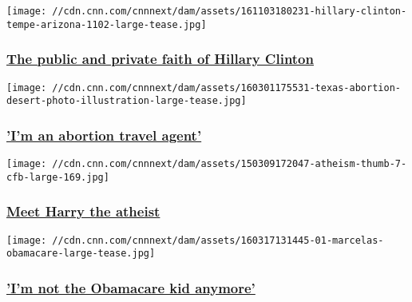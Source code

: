 \href{/2016/10/30/politics/clinton-faith-private/index.html}{}

\texttt{[image: //cdn.cnn.com/cnnnext/dam/assets/161103180231-hillary-clinton-tempe-arizona-1102-large-tease.jpg]}

\hypertarget{the-public-and-private-faith-of-hillary-clinton}{%
\subsubsection{\texorpdfstring{\href{/2016/10/30/politics/clinton-faith-private/index.html}{The
public and private faith of Hillary
Clinton}}{The public and private faith of Hillary Clinton}}\label{the-public-and-private-faith-of-hillary-clinton}}

\href{/2016/02/26/health/texas-abortion-access-desert/index.html}{}

\texttt{[image: //cdn.cnn.com/cnnnext/dam/assets/160301175531-texas-abortion-desert-photo-illustration-large-tease.jpg]}

\hypertarget{im-an-abortion-travel-agent}{%
\subsubsection{\texorpdfstring{\href{/2016/02/26/health/texas-abortion-access-desert/index.html}{'I'm
an abortion travel
agent'}}{'I'm an abortion travel agent'}}\label{im-an-abortion-travel-agent}}

\href{http://www.cnn.com/interactive/2015/03/living/friendly-atheists-next-door/}{}

\texttt{[image: //cdn.cnn.com/cnnnext/dam/assets/150309172047-atheism-thumb-7-cfb-large-169.jpg]}

\hypertarget{meet-harry-the-atheist}{%
\subsubsection{\texorpdfstring{\href{http://www.cnn.com/interactive/2015/03/living/friendly-atheists-next-door/}{Meet
Harry the
atheist}}{Meet Harry the atheist}}\label{meet-harry-the-atheist}}

\href{/2016/03/18/health/obamacare-kid-transgender/index.html}{}

\texttt{[image: //cdn.cnn.com/cnnnext/dam/assets/160317131445-01-marcelas-obamacare-large-tease.jpg]}

\hypertarget{im-not-the-obamacare-kid-anymore}{%
\subsubsection{\texorpdfstring{\href{/2016/03/18/health/obamacare-kid-transgender/index.html}{'I'm
not the Obamacare kid
anymore'}}{'I'm not the Obamacare kid anymore'}}\label{im-not-the-obamacare-kid-anymore}}

